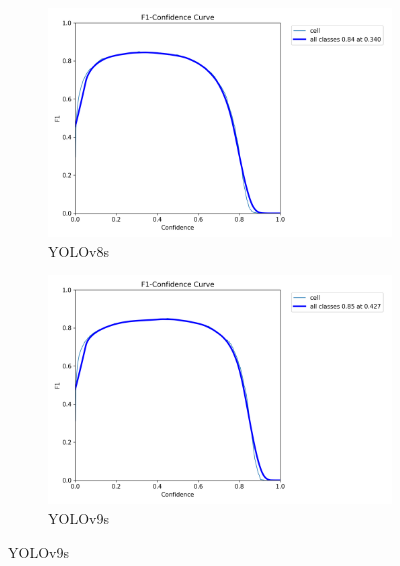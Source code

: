 \documentclass[12pt,a4paper,onecolumn,oneside]{report}
\begin{document}
\begin{figure}[H]
  \centering
  \begin{subfigure}[b]{0.48\textwidth}
    \centering
    \includegraphics[width=\textwidth]{figuras/resultados experimentacion/yolov8s/original_test/BoxF1_curve.png}
    \caption{YOLOv8s}
    \label{fig:yolov8s_original_test}
  \end{subfigure}
  \hfill
  \begin{subfigure}[b]{0.48\textwidth}
    \centering
    \includegraphics[width=\textwidth]{figuras/resultados experimentacion/yolov9s/original_test/BoxF1_curve.png}
    \caption{YOLOv9s}
    \label{fig:yolov9s_original_test}
  \end{subfigure}
  

\end{figure}
\end{document}
